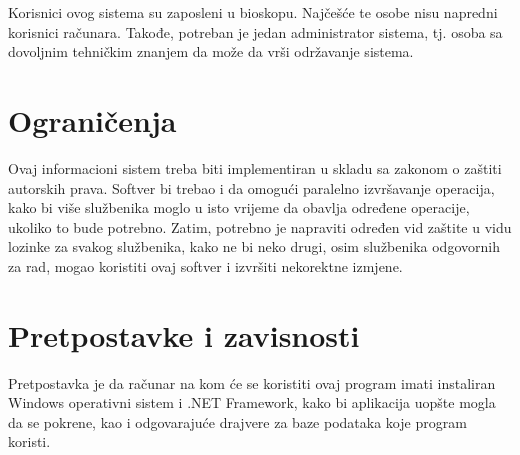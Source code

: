 Korisnici ovog sistema su zaposleni u bioskopu. Najčešće te osobe nisu napredni korisnici računara. Takođe, potreban je jedan administrator sistema, tj. osoba sa dovoljnim tehničkim znanjem da može da vrši održavanje sistema.
%
%

\section{Ograničenja}

Ovaj informacioni sistem treba biti implementiran u skladu sa zakonom o zaštiti autorskih prava. Softver bi trebao i da
omogući paralelno izvršavanje operacija, kako bi više službenika moglo u isto
vrijeme da obavlja određene operacije, ukoliko to bude potrebno.
Zatim, potrebno je napraviti određen vid zaštite u vidu lozinke za svakog službenika, kako ne bi neko drugi, osim službenika odgovornih za rad, mogao koristiti ovaj softver i izvršiti nekorektne izmjene.

\section{Pretpostavke i zavisnosti}

Pretpostavka je da računar na kom će se koristiti ovaj program imati
instaliran Windows operativni sistem i .NET Framework, kako bi aplikacija uopšte
mogla da se pokrene, kao i odgovarajuće drajvere za baze podataka koje program koristi.
